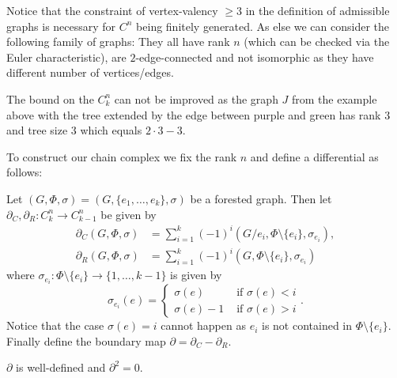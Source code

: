 \begin{remark}
	Notice that the constraint of vertex-valency $\geq 3$ in the definition of admissible graphs is necessary for $C^{n}$ being finitely generated.
	As else we can consider the following family of graphs:
	They all have rank $n$ (which can be checked via the Euler characteristic), are $2$-edge-connected and not isomorphic as they have different number of vertices/edges.
\end{remark}

\begin{remark}
	The bound on the $C_{k}^{n}$ can not be improved as the graph $J$ from the example above with the tree extended by the edge between purple and green has rank $3$ and
	tree size $3$ which equals $2 \cdot 3 -3$.
\end{remark}

To construct our chain complex we fix the rank $n$ and define a differential as follows:
\begin{definition}
	Let $(G,\Phi,\sigma) = (G, \{e_1,\ldots,e_{k}\},\sigma)$ be a forested graph. Then let $\partial_{C}, \partial_{R}: C_{k}^{n} \to C_{k-1}^{n}$ be given by
	\begin{align*}
		\partial_{C}(G,\Phi,\sigma) &= \sum_{i = 1}^{k} (-1)^{i} (G / e_{i}, \Phi \setminus \{e_{i}\}, \sigma_{e_{i}}),\\
		\partial _{R}(G,\Phi,\sigma) &= \sum_{i = 1}^{k} (-1)^{i} (G,\Phi \setminus \{e_{i}\}, \sigma_{e_{i}}) 
	\end{align*}
	where $\sigma_{e_{i}}: \Phi \setminus \{e_{i}\} \to \{1,\ldots,k-1\}$ is given by
	\[
		\sigma_{e_{i}}(e) = \begin{cases}
			\sigma(e) & \text{ if }\sigma(e) < i\\
			\sigma(e) - 1 & \text{ if } \sigma(e) > i
		\end{cases}
	.\]
	Notice that the case $\sigma(e) = i$ cannot happen as $e_{i}$ is not contained in $\Phi \setminus \{e_{i}\}$. 
	Finally define the boundary map $\partial = \partial_{C} - \partial_{R}$.
\end{definition}

\begin{proposition}
	$\partial$ is well-defined and $\partial^2 = 0$.
\end{proposition}

